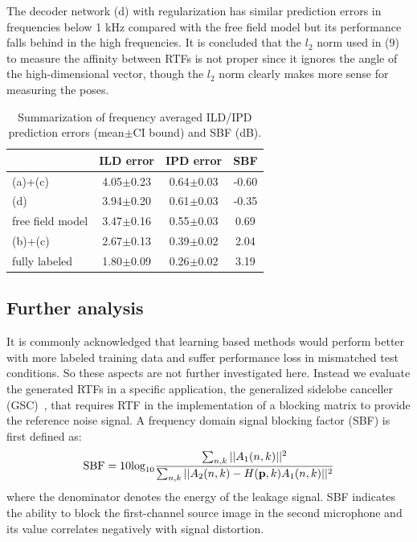 \documentclass{article}
\begin{document}
The decoder network (d) with regularization has similar prediction errors in frequencies below 1 kHz compared with the free field model but its performance falls behind in the high frequencies. It is concluded that the $l_2$ norm used in (9) to measure the affinity between RTFs is not proper since it ignores the angle of the high-dimensional vector, though the $l_2$ norm clearly makes more sense for measuring the poses.

\begin{table}[tb]
\caption{Summarization of frequency averaged ILD/IPD prediction errors (mean$\pm$CI bound) and SBF (dB).}
\label{table:1}
\begin{center}
\begin{tabular}{|l|c|c||c|}
  \hline
                       & ILD error & IPD error & SBF \\ \hline
   (a)+(c)    & 4.05$\pm$0.23 & 0.64$\pm$0.03  &  -0.60\\ \hline
   (d)        & 3.94$\pm$0.20 & 0.61$\pm$0.03   &  -0.35\\ \hline
   free field model & 3.47$\pm$0.16 & 0.55$\pm$0.03 & 0.69\\ \hline
   (b)+(c)    & 2.67$\pm$0.13 & 0.39$\pm$0.02    &  2.04   \\ \hline
   fully labeled & 1.80$\pm$0.09 & 0.26$\pm$0.02 &  3.19 \\ \hline
\end{tabular}
\end{center}
\end{table}



\subsection{Further analysis}

It is commonly acknowledged that learning based methods would perform better with more labeled training data and suffer performance loss in mismatched test conditions. So these aspects are not further investigated here. Instead we evaluate the generated RTFs in a specific application, the generalized sidelobe canceller (GSC)~\cite{gannot2001signal}, that requires RTF in the implementation of a blocking matrix to provide the reference noise signal. A frequency domain signal blocking factor (SBF) is first defined as:
\begin{equation}\label{eq:sbf}
  \text{SBF}=10\text{log}_{10}\frac{\sum_{n,k} ||A_1(n,k)||^2}{\sum_{n,k} ||A_2(n,k)-H({\bf p},k)A_1(n,k)||^2}
\end{equation}
where the denominator denotes the energy of the leakage signal. SBF indicates the ability to block the first-channel source image in the second microphone and its value correlates negatively with signal distortion.
\end{document}
